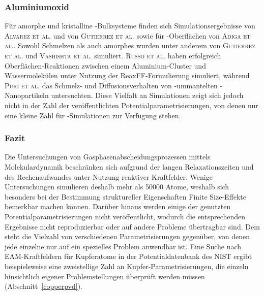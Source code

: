 \subsubsection{Aluminiumoxid}
Für amorphe und kristalline -Bulksysteme finden sich Simulationsergebnisse von \textsc{Alvarez et al.}\cite{alvarez_computer_1995,alvarez_molecular_1992} und von \textsc{Gutierrez et al.}\cite{gutierrez_molecular_2002} sowie für -Oberflächen von \textsc{Adiga et al.}\cite{adiga_atomistic_2006}.
Sowohl Schmelzen als auch amorphes  wurden unter anderem von \textsc{Gutierrez et al.}\cite{gutierrez_structural_2000} und \textsc{Vashishta et al.}\cite{vashishta_interaction_2008} simuliert.
\textsc{Russo et al.}\cite{russo_molecular_2011} haben erfolgreich Oberflächen-Reaktionen zwischen einem Aluminium-Cluster und Wassermolekülen unter Nutzung der ReaxFF-Formulierung simuliert, während \textsc{Puri et al.}\cite{puri_thermo-mechanical_2010} das Schmelz- und Diffusionsverhalten von -ummantelten -Nanopartikeln untersuchten.
Diese Vielfalt an Simulationen zeigt sich jedoch nicht in der Zahl der veröffentlichten Potentialparametrisierungen, von denen nur eine kleine Zahl für -Simulationen zur Verfügung stehen.

\subsubsection{Fazit}
Die Untersuchungen von Gasphasenabscheidungsprozessen mittels Molekulardynamik beschränken sich aufgrund der langen Relaxationszeiten und des Rechenaufwandes unter Nutzung reaktiver Kraftfelder.
Wenige Untersuchungen simulieren deshalb mehr als \num{50000} Atome, weshalb sich besonders bei der Bestimmung struktureller Eigenschaften Finite Size-Effekte bemerkbar machen können.
Darüber hinaus werden einige der genutzten Potentialparametrisierungen nicht veröffentlicht, wodurch die entsprechenden Ergebnisse nicht reproduzierbar oder auf andere Probleme übertragbar sind.
Dem steht die Vielzahl von verschiedenen Parametrisierungen gegenüber, von denen jede einzelne nur auf ein spezielles Problem anwendbar ist.
Eine Suche nach EAM-Kraftfeldern für Kupferatome in der Potentialdatenbank des NIST\cite{becker_interatomic_2014} ergibt beispielsweise eine zweistellige Zahl an Kupfer-Parametrisierungen, die einzeln hinsichtlich eigener Problemstellungen überprüft werden müssen (Abschnitt~\ref{copperpvd}).
